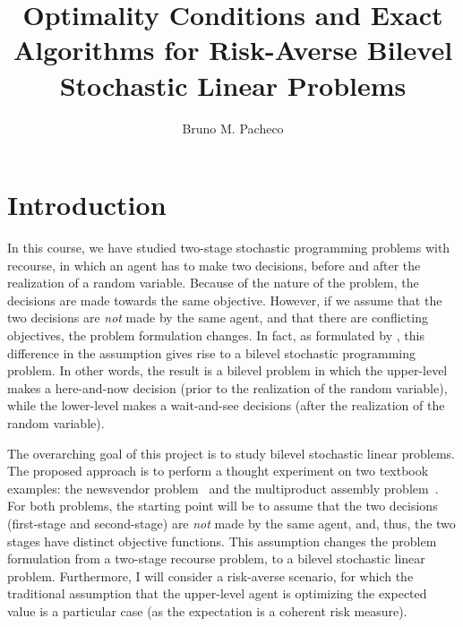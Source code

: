 \documentclass[twoside,11pt]{article}
\begin{document}
\title{Optimality Conditions and Exact Algorithms for Risk-Averse Bilevel Stochastic Linear Problems}

\author{Bruno M. Pacheco}

\maketitle

\section*{Introduction}

In this course, we have studied two-stage stochastic programming problems with recourse, in which an agent has to make two decisions, before and after the realization of a random variable.
Because of the nature of the problem, the decisions are made towards the same objective.
However, if we assume that the two decisions are \emph{not} made by the same agent, and that there are conflicting objectives, the problem formulation changes.
In fact, as formulated by \citet{burtscheidtBilevelLinearOptimization2020}, this difference in the assumption gives rise to a bilevel stochastic programming problem.
In other words, the result is a bilevel problem in which the upper-level makes a here-and-now decision (prior to the realization of the random variable), while the lower-level makes a wait-and-see decisions (after the realization of the random variable).

The overarching goal of this project is to study bilevel stochastic linear problems.
The proposed approach is to perform a thought experiment on two textbook examples: the newsvendor problem~\citep{birgeIntroductionStochasticProgramming2011,shapiroLecturesStochasticProgramming2009} and the multiproduct assembly problem~\citep{shapiroLecturesStochasticProgramming2009}.
For both problems, the starting point will be to assume that the two decisions (first-stage and second-stage) are \emph{not} made by the same agent, and, thus, the two stages have distinct objective functions.
This assumption changes the problem formulation from a two-stage recourse problem, to a bilevel stochastic linear problem. 
Furthermore, I will consider a risk-averse scenario, for which the traditional assumption that the upper-level agent is optimizing the expected value is a particular case (as the expectation is a coherent risk measure).
\end{document}
